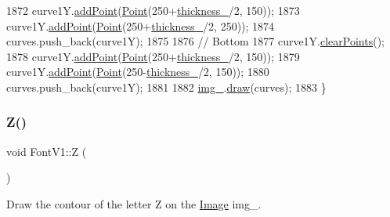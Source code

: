 \begin{DoxyCode}
1872     curve1Y.\mbox{\hyperlink{class_bezier_curve_a38d16c18b36ae45619b05e26e226cf34}{addPoint}}(\mbox{\hyperlink{class_point}{Point}}(250+\mbox{\hyperlink{class_font_v1_aed8040e76be9a52833627b92f0fb4e5f}{thickness\_}}/2, 150));
1873     curve1Y.\mbox{\hyperlink{class_bezier_curve_a38d16c18b36ae45619b05e26e226cf34}{addPoint}}(\mbox{\hyperlink{class_point}{Point}}(250+\mbox{\hyperlink{class_font_v1_aed8040e76be9a52833627b92f0fb4e5f}{thickness\_}}/2, 250));
1874     curves.push\_back(curve1Y);
1875 
1876     \textcolor{comment}{// Bottom}
1877     curve1Y.\mbox{\hyperlink{class_bezier_curve_a0ba8ce66d5af5971ae6a1b506029728e}{clearPoints}}();
1878     curve1Y.\mbox{\hyperlink{class_bezier_curve_a38d16c18b36ae45619b05e26e226cf34}{addPoint}}(\mbox{\hyperlink{class_point}{Point}}(250+\mbox{\hyperlink{class_font_v1_aed8040e76be9a52833627b92f0fb4e5f}{thickness\_}}/2, 150));
1879     curve1Y.\mbox{\hyperlink{class_bezier_curve_a38d16c18b36ae45619b05e26e226cf34}{addPoint}}(\mbox{\hyperlink{class_point}{Point}}(250-\mbox{\hyperlink{class_font_v1_aed8040e76be9a52833627b92f0fb4e5f}{thickness\_}}/2, 150));
1880     curves.push\_back(curve1Y);
1881 
1882     \mbox{\hyperlink{class_font_v1_a00569e3e3c4b70f437b63f396f735fb0}{img\_}}.\mbox{\hyperlink{class_image_a8d162f3cab956131d58708c09aa560b0}{draw}}(curves);
1883 \}
\end{DoxyCode}
\mbox{\label{class_font_v1_a10df574bc5aa14a43988d42db4e89504}} 
\subsubsection{\texorpdfstring{Z()}{Z()}}
{\footnotesize\ttfamily void Font\+V1\+::Z (\begin{DoxyParamCaption}{ }\end{DoxyParamCaption})}



Draw the contour of the letter Z on the \mbox{\hyperlink{class_image}{Image}} img\+\_\+. 


